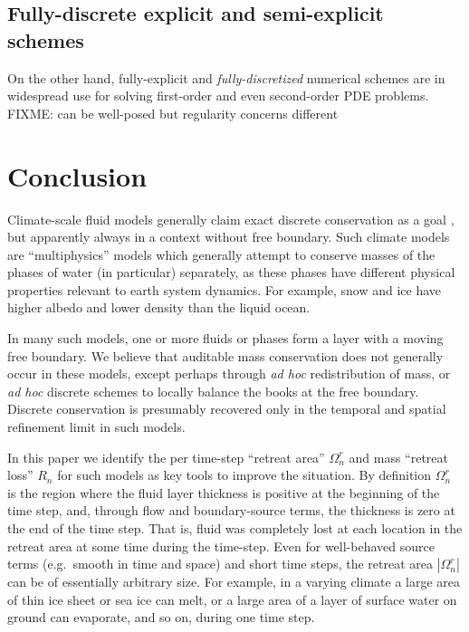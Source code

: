 \documentclass[final,leqno,onefignum,onetabnum]{siamltex1213bueler}
\begin{document}
\subsection{Fully-discrete explicit and semi-explicit schemes} \label{subsec:spaceexplicit}  On the other hand, fully-explicit and \emph{fully-discretized} numerical schemes are in widespread use for solving first-order and even second-order PDE problems.  FIXME:  can be well-posed but regularity concerns different


\section{Conclusion} \label{sec:conclusion}

Climate-scale fluid models generally claim exact discrete conservation as a goal \cite{Thuburn2008}, but apparently always in a context without free boundary.  Such climate models are ``multiphysics'' models which generally attempt to conserve masses of the phases of water (in particular) separately, as these phases have different physical properties relevant to earth system dynamics.  For example, snow and ice have higher albedo and lower density than the liquid ocean.

In many such models, one or more fluids or phases form a layer with a moving free boundary.  We believe that auditable mass conservation does not generally occur in these models, except perhaps through \emph{ad hoc} redistribution of mass, or \emph{ad hoc} discrete schemes to locally balance the books at the free boundary.  Discrete conservation is presumably recovered only in the temporal and spatial refinement limit in such models.

In this paper we identify the per time-step ``retreat area'' $\Omega_n^r$ and mass ``retreat loss'' $R_n$ for such models as key tools to improve the situation.  By definition $\Omega_n^r$ is the region where the fluid layer thickness is positive at the beginning of the time step, and, through flow and boundary-source terms, the thickness is zero at the end of the time step.  That is, fluid was completely lost at each location in the retreat area at some time during the time-step.  Even for well-behaved source terms (e.g.~smooth in time and space) and short time steps, the retreat area $|\Omega_n^r|$ can be of essentially arbitrary size.  For example, in a varying climate a large area of thin ice sheet or sea ice can melt, or a large area of a layer of surface water on ground can evaporate, and so on, during one time step.
\end{document}
